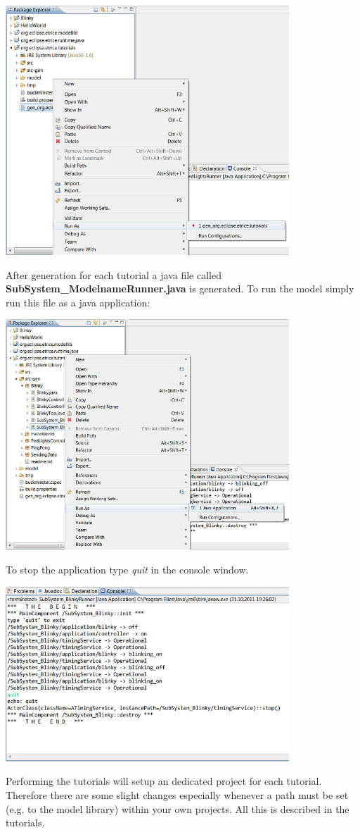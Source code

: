 \includegraphics[width=0.8\textwidth]{images/013-SetupWorkspace05.png}

After generation for each tutorial a java file called \textbf{SubSystem\_ModelnameRunner.java} is 
generated. To run the model simply run this file as a java application:

\includegraphics[width=0.8\textwidth]{images/013-SetupWorkspace06.png}

To stop the application type \textit{quit} in the console window.
 
\includegraphics[width=0.8\textwidth]{images/013-SetupWorkspace07.png} 

Performing the tutorials will setup an dedicated project for each tutorial. Therefore there are some 
slight changes especially whenever a path must be set (e.g. to the model library) within your own 
projects. All this is described in the tutorials.
